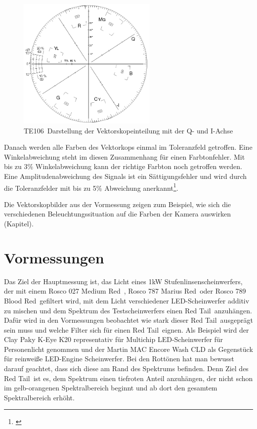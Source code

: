 \begin{figure}[H]     %
\centering
\includegraphics[width=0.6\textwidth]{bilder/vektorskop} 
\caption {\glqq TE106\grqq\ Darstellung der Vektorskopeinteilung mit der Q- und I-Achse\protect\footnotemark}\label{b_vektorskop}
\end{figure}

Danach werden alle Farben des Vektorkops einmal im Toleranzfeld getroffen. Eine Winkelabweichung steht im diesen Zusammenhang für einen Farbtonfehler. Mit bis zu 3\% Winkelabweichung kann der richtige Farbton noch getroffen werden. Eine Amplitudenabweichung des Signals ist ein Sättigungsfehler und wird durch die Toleranzfelder mit bis zu 5\% Abweichung anerkannt\footnote{\cite[114]{schmidt}}.

Die Vektorskopbilder aus der Vormessung zeigen zum Beispiel, wie sich die verschiedenen Beleuchtungssituation auf die Farben der Kamera auswirken (Kapitel).

\chapter{Vormessungen}

Das Ziel der Hauptmessung ist, das Licht eines 1kW Stufenlinsenscheinwerfers, der mit einem Rosco 027 \glqq Medium Red\grqq\ , Rosco 787 \glqq Marius Red\grqq\ oder Rosco 789 \glqq Blood Red\grqq\ gefiltert wird, mit dem Licht verschiedener LED-Scheinwerfer additiv zu mischen und dem Spektrum des Testscheinwerfers einen \glqq Red Tail\grqq\ anzuhängen. 
Dafür wird in den Vormessungen beobachtet wie stark dieser \glqq Red Tail\grqq\ ausgeprägt sein muss und welche Filter sich für einen \glqq Red Tail\grqq\ eignen.   
Als Beispiel wird der Clay Paky K-Eye K20 representativ für Multichip LED-Scheinwerfer für Personenlicht genommen und der Martin MAC Encore Wash CLD als Gegenstück für reinweiße LED-Engine Scheinwerfer. 
Bei den Rottönen hat man bewusst darauf geachtet, dass sich diese am Rand des Spektrums befinden. Denn Ziel des \glqq Red Tail\grqq\ ist es, dem Spektrum einen tiefroten Anteil anzuhängen, der nicht schon im gelb-orangenen Spektralbereich beginnt und ab dort den gesamtem Spektralbereich erhöht.  

